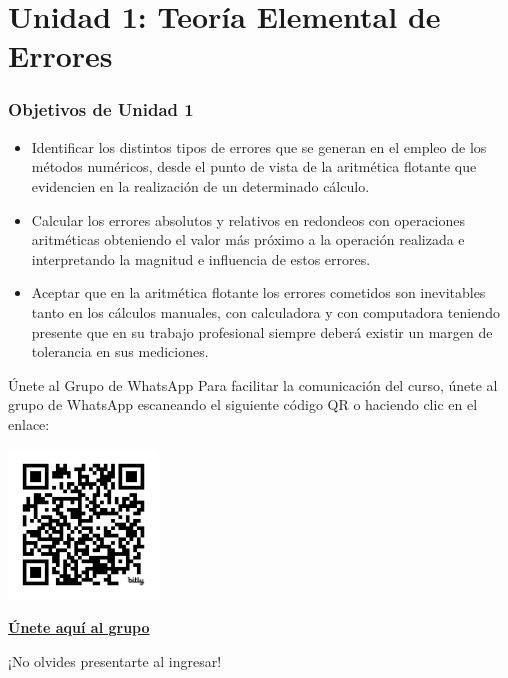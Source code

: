 \documentclass{beamer}
\begin{document}
\section{Unidad 1: Teoría Elemental de Errores}
\begin{frame}
\frametitle{Objetivos de Unidad 1}
    \begin{itemize}
        \item Identificar los distintos tipos de errores que se generan en el empleo de los métodos numéricos, desde el punto de vista de la aritmética flotante que evidencien en la realización de un determinado cálculo.
        \item Calcular los errores absolutos y relativos en redondeos con operaciones aritméticas obteniendo el valor más próximo a la operación realizada e interpretando la magnitud e influencia de estos errores.
        \item Aceptar que en la aritmética flotante los errores cometidos son inevitables tanto en los cálculos manuales, con calculadora y con computadora teniendo presente que en su trabajo profesional siempre deberá existir un margen de tolerancia en sus mediciones.
    \end{itemize}
\end{frame}

\begin{frame}{Únete al Grupo de WhatsApp}
    \centering
    Para facilitar la comunicación del curso, únete al grupo de WhatsApp escaneando el siguiente código QR o haciendo clic en el enlace:  

    \vspace{0.5cm}
    
    \includegraphics[width=4cm]{images/whatsapp_mn2025.png} %
    
    \vspace{0.5cm}

    \Large \textbf{\href{https://chat.whatsapp.com/Liee39TzC9U0Q9u5E0f5Ff}{Únete aquí al grupo}}
    
    \vspace{0.5cm}

    ¡No olvides presentarte al ingresar!
\end{frame}
\end{document}
